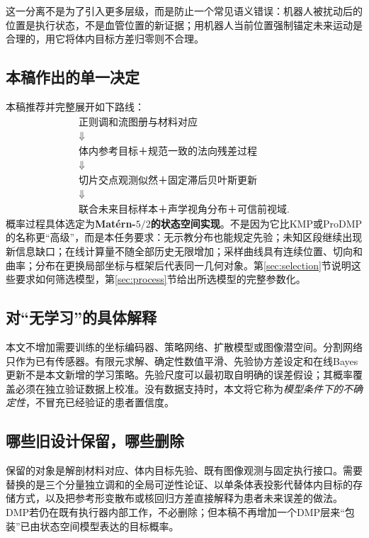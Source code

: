 \documentclass[UTF8,11pt,a4paper,fontset=fandol]{ctexart}
\numberwithin{equation}{section}
\theoremstyle{plain}
\theoremstyle{definition}
\theoremstyle{remark}
\begin{document}
这一分离不是为了引入更多层级，而是防止一个常见语义错误：机器人被扰动后的位置是执行状态，不是血管位置的新证据；用机器人当前位置强制锚定未来运动是合理的，用它将体内目标方差归零则不合理。

\subsection{本稿作出的单一决定}
本稿推荐并完整展开如下路线：
\begin{equation}
\boxed{\begin{gathered}
\text{正则调和流图册与材料对应}\\
\Downarrow\\
\text{体内参考目标＋规范一致的法向残差过程}\\
\Downarrow\\
\text{切片交点观测似然＋固定滞后贝叶斯更新}\\
\Downarrow\\
\text{联合未来目标样本＋声学视角分布＋可信前视域}.
\end{gathered}}
\label{eq:single-route}
\end{equation}
概率过程具体选定为\textbf{Mat\'ern-$5/2$的状态空间实现}。不是因为它比KMP或ProDMP的名称更“高级”，而是本任务要求：无示教分布也能规定先验；未知区段继续出现新信息缺口；在线计算量不随全部历史无限增加；采样曲线具有连续位置、切向和曲率；分布在更换局部坐标与框架后代表同一几何对象。第\ref{sec:selection}节说明这些要求如何筛选模型，第\ref{sec:process}节给出所选模型的完整参数化。

\subsection{对“无学习”的具体解释}
本文不增加需要训练的坐标编码器、策略网络、扩散模型或图像潜空间。分割网络只作为已有传感器。有限元求解、确定性数值平滑、先验协方差设定和在线Bayes更新不是本文新增的学习策略。先验尺度可以最初取自明确的误差假设；其概率覆盖必须在独立验证数据上校准。没有数据支持时，本文将它称为\emph{模型条件下的不确定性}，不冒充已经验证的患者置信度。

\subsection{哪些旧设计保留，哪些删除}
保留的对象是解剖材料对应、体内目标先验、既有图像观测与固定执行接口。需要替换的是三个分量独立调和的全局可逆性论证、以单条体表投影代替体内目标的存储方式，以及把参考形变散布或核回归方差直接解释为患者未来误差的做法。DMP若仍在既有执行器内部工作，不必删除；但本稿不再增加一个DMP层来“包装”已由状态空间模型表达的目标概率。
\end{document}
